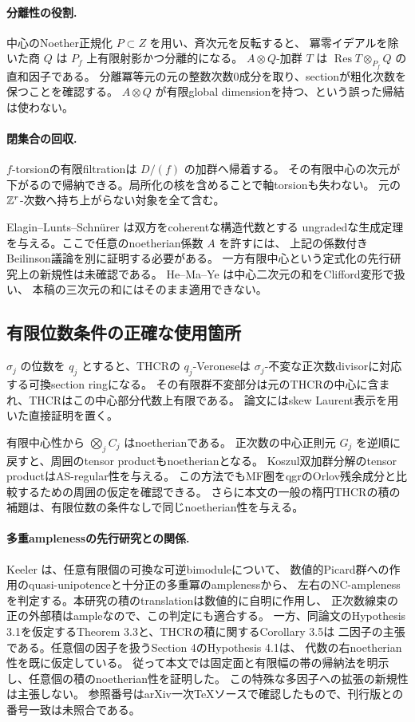\paragraph{分離性の役割.}
中心のNoether正規化 \(P\subset Z\) を用い、斉次元を反転すると、
冪零イデアルを除いた商 \(Q\) は \(P_f\) 上有限射影かつ分離的になる。
\(A\otimes Q\)-加群 \(T\) は \(\operatorname{Res}T\otimes_{P_f}Q\) の直和因子である。
分離冪等元の元の整数次数0成分を取り、sectionが粗化次数を保つことを確認する。
\(A\otimes Q\) が有限global dimensionを持つ、という誤った帰結は使わない。

\paragraph{閉集合の回収.}
\(f\)-torsionの有限filtrationは \(D/(f)\) の加群へ帰着する。
その有限中心の次元が下がるので帰納できる。局所化の核を含めることで軸torsionも失わない。
元の \(\mathbb Z^r\)-次数へ持ち上がらない対象を全て含む。

Elagin--Lunts--Schn\"urer \cite[Theorem 4.18]{ELS} は双方をcoherentな構造代数とする
ungradedな生成定理を与える。ここで任意のnoetherian係数 \(A\) を許すには、
上記の係数付きBeilinson議論を別に証明する必要がある。
一方有限中心という定式化の先行研究上の新規性は未確認である。
He--Ma--Ye \cite{HMY} は中心二次元の和をClifford変形で扱い、
本稿の三次元の和にはそのまま適用できない。

\subsection{有限位数条件の正確な使用箇所}

\(\sigma_j\) の位数を \(q_j\) とすると、THCRの \(q_j\)-Veroneseは
\(\sigma_j\)-不変な正次数divisorに対応する可換section ringになる。
その有限群不変部分は元のTHCRの中心に含まれ、THCRはこの中心部分代数上有限である。
論文にはskew Laurent表示を用いた直接証明を置く。

有限中心性から \(\bigotimes_jC_j\) はnoetherianである。
正次数の中心正則元 \(G_j\) を逆順に戻すと、周囲のtensor productもnoetherianとなる。
Koszul双加群分解のtensor productはAS-regular性を与える。
この方法でもMF圏をqgrのOrlov残余成分と比較するための周囲の仮定を確認できる。
さらに本文の一般の楕円THCRの積の補題は、有限位数の条件なしで同じnoetherian性を与える。

\paragraph{多重amplenessの先行研究との関係.}
Keeler \cite[Theorem 2.7, Corollary 2.8]{KeelerMulti} は、任意有限個の可換な可逆bimoduleについて、
数値的Picard群への作用のquasi-unipotenceと十分正の多重冪のamplenessから、
左右のNC-amplenessを判定する。本研究の積のtranslationは数値的に自明に作用し、
正次数線束の正の外部積はampleなので、この判定にも適合する。
一方、同論文のHypothesis 3.1を仮定するTheorem 3.3と、THCRの積に関するCorollary 3.5は
二因子の主張である。任意個の因子を扱うSection 4のHypothesis 4.1は、
代数の右noetherian性を既に仮定している。
従って本文では固定面と有限幅の帯の帰納法を明示し、任意個の積のnoetherian性を証明した。
この特殊な多因子への拡張の新規性は主張しない。
参照番号はarXiv一次TeXソースで確認したもので、刊行版との番号一致は未照合である。

